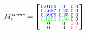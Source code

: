 \documentclass{beamer}
\begin{document}
\begin{frame}
\begin{minipage}{0.21\textwidth}
			    
						$ M^{\textit{trunc}}_e=\left[\begin{smallmatrix}
						\textcolor{blue}{0.0156}  &       \textcolor{blue}{0}   &      0   &      0\\
						\textcolor{blue}{0.4687}  &  \textcolor{blue}{0.25}  &  0   & 0\\
						\textcolor{blue}{0.3906} &   \textcolor{blue}{0.25}   & 0  &0\\
						\textcolor{green}{0.1250} &   \textcolor{green}{ 0.50} &   0 &   0\\
					0       &  0   & \textcolor{red}{1}      &   \textcolor{red}{0}\\
					0      &  0  &      \textcolor{red}{0}  &  \textcolor{red}{1}\\
						\end{smallmatrix} \right]
						$
			
			
		\end{minipage}
	
	
\end{frame}
\end{document}
